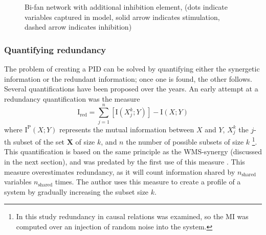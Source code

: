 \documentclass[../main.tex]{subfiles}
\begin{document}
\begin{figure}[ht]
\begin{center}
\end{center}
\caption{Bi-fan network with additional inhibition element, (dots indicate variables captured in model, solid arrow indicates stimulation, dashed arrow indicates inhibition)}
\label{bifan_syn}
\end{figure}

\subsubsection{Quantifying redundancy}

The problem of creating a PID can be solved by quantifying either the synergetic information or the redundant information; once one is found, the other follows.
Several quantifications have been proposed over the years.
An early attempt at a redundancy quantification was the measure
%
\begin{equation}
\mathrm{I}_\mathrm{red} = \sum_{j=1}^n [\mathrm{I}\left( X_j^k;Y \right) ] - \mathrm{I} \left( X;Y \right)
\end{equation}
%
where $\mathrm{I}^\mathrm{P}(X;Y)$ represents the mutual information between $X$ and $Y$, $X_j^k$ the $j$-th subset of the set $\mathbf{X}$ of size $k$, and $n$ the number of possible subsets of size $k$ \cite{tononi1999measures}\footnote{In this study redundancy in causal relations was examined, so the MI was computed over an injection of random noise into the system.}.
This quantification is based on the same principle as the WMS-synergy (discussed in the next section), and was predated by the first use of this measure \cite{gawne1993independent}.
This measure overestimates redundancy, as it will count information shared by $n_\mathrm{shared}$ variables $n_\mathrm{shared}$ times.
The author uses this measure to create a profile of a system by gradually increasing the subset size $k$.
\end{document}
